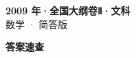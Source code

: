 \documentclass[zihao=-4, a4paper]{ctexart}
\begin{document}
\begin{center}
  {\Large\bfseries 2009 年·全国大纲卷Ⅱ·文科}\\[4pt]
  {\large 数学 · 简答版}
\end{center}
\medskip
{}

\clearpage
{}
\begin{center}{\Large\bfseries 答案速查}\end{center}
\medskip

\end{document}

